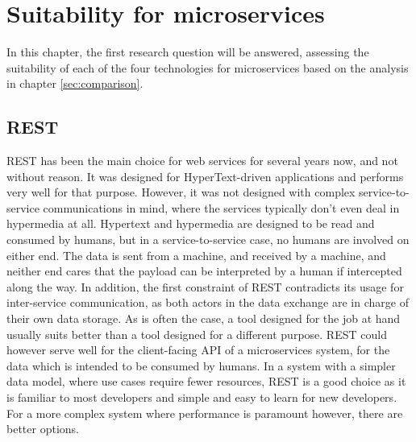 \chapter{Suitability for microservices}\label{sec:suitability}
In this chapter, the first research question will be answered, assessing the suitability of each of the four technologies for microservices based on the analysis in chapter \ref{sec:comparison}.

\section{REST}
REST has been the main choice for web services for several years now, and not without reason. It was designed for HyperText-driven applications \cite{fielding2017reflections} and performs very well for that purpose. However, it was not designed with complex service-to-service communications in mind, where the services typically don't even deal in hypermedia at all. Hypertext and hypermedia are designed to be read and consumed by humans, but in a service-to-service case, no humans are involved on either end. The data is sent from a machine, and received by a machine, and neither end cares that the payload can be interpreted by a human if intercepted along the way. In addition, the first constraint of REST contradicts its usage for inter-service communication, as both actors in the data exchange are in charge of their own data storage. As is often the case, a tool designed for the job at hand usually suits better than a tool designed for a different purpose. REST could however serve well for the client-facing API of a microservices system, for the data which is intended to be consumed by humans. In a system with a simpler data model, where use cases require fewer resources, REST is a good choice as it is familiar to most developers and simple and easy to learn for new developers. For a more complex system where performance is paramount however, there are better options.

